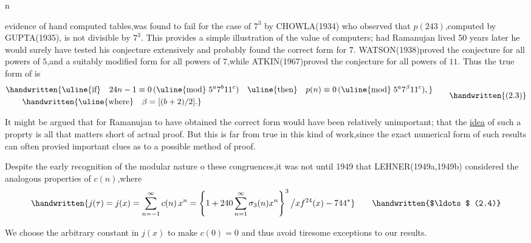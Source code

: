 \noindent\hfill {}n 

\noindent evidence of hand computed tables,was found to fail for the case of $7^{3}$ by CHOWLA(1934) who observed that $p(243)$,computed by GUPTA(1935), is not divisible by $7^{3}$. This provides a simple illustration of the value of computers; had Ramanujan lived 50 years later he would surely have tested his conjecture extensively and probably found the correct form for $7$. WATSON(1938)proved the conjecture for all powers of $5$,and a suitably modified form for all powers of $7$,while ATKIN(1967)proved the conjecture for all powers of $11$. Thus the true form of  is
\[
\begin{aligned}
&\handwritten{\text{\uline{if}}\quad 24n-1\equiv0\,(\text{\uline{mod}}\;5^{a}7^{b}11^{c})\quad
\text{\uline{then}}\quad p(n)\equiv0\,(\text{\uline{mod}}\;5^{a}7^{\beta}11^{c}),}\\
&\qquad\handwritten{\text{\uline{where}}\quad \beta=[(b+2)/2].}
\end{aligned}
\tag*{\handwritten{(2.3)}}
\]

It might be argued that for Ramanujan to have obtained the correct form would have been relatively unimportant; that the \uline{idea} of such a proprty is all that matters short of actual proof. But this is far from true in this kind of work,since the exact numerical form of such results can often provied important clues as to a possible method of proof.

Despite the early recognition of the modular nature o these congruences,it was not until 1949 that LEHNER(1949a,1949b) considered the analogous properties of $c(n)$,where
\[
\handwritten{j(\tau)=j(x)=\sum_{n=-1}^{\infty}c(n)\,x^{n}
=\left\{1+240\sum_{n=1}^{\infty}\sigma_{3}(n)x^{n}\right\}^{3}\big/xf^{24}(x)-744^{*}}
\tag*{\handwritten{$\ldots$ (2.4)}}
\]

\noindent\handwritten{\rule{\linewidth}{0.4pt}}

\noindent *We choose the arbitrary constant in $j(x)$ to make $c(0)=0$ and thus avoid tiresome exceptions to our results.

